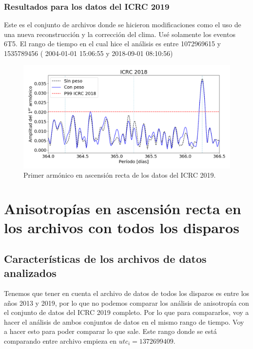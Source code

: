      \subsubsection{Resultados para los datos del ICRC 2019}
      
      Este es el conjunto de archivos donde se hicieron modificaciones como el uso de una nueva reconstrucción y la corrección del clima. Usé solamente los eventos 6T5. El rango de tiempo en el cual hice  el análisis es entre 1072969615 y 1535789456 ( 2004-01-01 15:06:55 y   2018-09-01 08:10:56)

      \begin{figure}[H]
        \centering
        \includegraphics[width=\textwidth]{../0_Introduccion/ICRC/ICRC2019_Eraw_Eraw_hex.png}
        \caption{Primer armónico en ascensión recta de los datos del ICRC 2019.} \label{fig:8EeV_con_peso_ICRC2019}
      \end{figure}


      
  \section{Anisotropías en ascensión recta en los archivos con todos los disparos}
    \subsection{Características de los archivos de datos analizados}

      Tenemos que tener en cuenta el archivo de datos de todos los disparos es entre los años 2013 y 2019, por lo que no podemos comparar los análisis de anisotropía con el conjunto  de datos del ICRC 2019 completo. Por lo que para compararlos, voy a hacer el análisis de ambos conjuntos de datos en el mismo rango de tiempo. Voy a hacer esto para poder comparar lo que sale.       Este rango donde se está comparando entre archivo empieza en  $utc_i = 1372699409 $.

